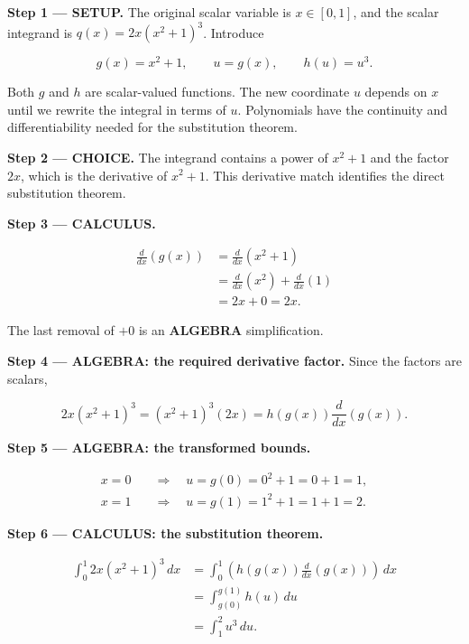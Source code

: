 \documentclass[11pt,oneside,openany]{book}
\begin{document}
\textbf{Step 1 --- SETUP.} The original scalar variable is \(x\in[0,1]\), and the scalar integrand is \(q(x)=2x(x^2+1)^3\). Introduce

\[
g(x)=x^2+1,\qquad u=g(x),\qquad h(u)=u^3.
\]

Both \(g\) and \(h\) are scalar-valued functions. The new coordinate \(u\) depends on \(x\) until we rewrite the integral in terms of \(u\). Polynomials have the continuity and differentiability needed for the substitution theorem.

\begin{ChoiceStep}
\textbf{Step 2 --- CHOICE.} The integrand contains a power of \(x^2+1\) and the factor \(2x\), which is the derivative of \(x^2+1\). This derivative match identifies the direct substitution theorem.

\end{ChoiceStep}
\textbf{Step 3 --- CALCULUS.}

\[
\begin{aligned}
\frac{d}{dx}\left(g(x)\right)
&=\frac{d}{dx}\left(x^2+1\right)\\
&=\frac{d}{dx}\left(x^2\right)+\frac{d}{dx}\left(1\right)\\
&=2x+0=2x.
\end{aligned}
\]

The last removal of \(+0\) is an \textbf{ALGEBRA} simplification.

\begingroup\color{AlgebraBlue}
\textbf{Step 4 --- ALGEBRA: the required derivative factor.} Since the factors are scalars,

\[
2x(x^2+1)^3=(x^2+1)^3(2x)
=h(g(x))\frac{d}{dx}\left(g(x)\right).
\]

\endgroup
\begingroup\color{AlgebraBlue}
\textbf{Step 5 --- ALGEBRA: the transformed bounds.}

\[
\begin{aligned}
x=0&\quad\Longrightarrow\quad u=g(0)=0^2+1=0+1=1,\\
x=1&\quad\Longrightarrow\quad u=g(1)=1^2+1=1+1=2.
\end{aligned}
\]

\endgroup
\textbf{Step 6 --- CALCULUS: the substitution theorem.}

\[
\begin{aligned}
\int_{0}^{1} 2x(x^2+1)^3\,dx
&=\int_{0}^{1}
\left(h(g(x))\frac{d}{dx}\left(g(x)\right)\right)\,dx\\
&=\int_{g(0)}^{g(1)} h(u)\,du\\
&=\int_{1}^{2} u^3\,du.
\end{aligned}
\]
\end{document}
